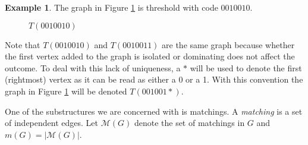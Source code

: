 \documentclass[12pt]{amsart}
\theoremstyle{plain}
\theoremstyle{definition}
\newtheorem{ex}[thm]{Example}
\newcommand{\cM}{\mathcal{M}}
\begin{document}
\begin{ex}  The graph in Figure \ref{fig:threshold} is threshold with code $0010010$.
\label{thresholdex}
\begin{figure}[!ht]
\begin{center}

\caption{$T(0010010)$}
\label{fig:threshold}
\end{center}
\end{figure}


\end{ex}

Note that $T(0010010)$ and $T(0010011)$ are the same graph because whether the first vertex added to the graph is isolated or dominating does not affect the outcome.  To deal with this lack of uniqueness, a $*$ will be used to denote the first (rightmost) vertex as it can be read as either a 0 or a 1. With this convention the graph in Figure \ref{fig:threshold} will be denoted  $T(001001*)$.


One of the substructures we are concerned with is matchings.  A \emph{matching} is a set of independent edges.  Let $\cM(G)$ denote the set of matchings in $G$ and $m(G) = |\cM(G)|$.  %
\end{document}
